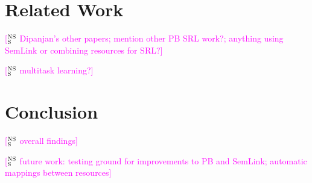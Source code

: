 \documentclass[11pt,a4paper]{article}
\newcommand{\ensuretext}[1]{#1}
\newcommand{\nssmarker}{\ensuretext{\textcolor{magenta}{\ensuremath{^{\textsc{NS}}_{\textsc{S}}}}}}
\newcommand{\arkcomment}[3]{\ensuretext{\textcolor{#3}{[#1 #2]}}}
\newcommand{\nss}[1]{\arkcomment{\nssmarker}{#1}{magenta}}
\newcommand{\finalversion}[1]{}
\begin{document}
\section{Related Work}

\nss{Dipanjan's other papers; mention other PB SRL work?; anything using SemLink or combining resources for SRL?}

\nss{multitask learning?}

\section{Conclusion}

\nss{overall findings}

\nss{future work: testing ground for improvements to PB and SemLink; automatic mappings between resources}

\finalversion{\section*{Acknowledgments}

FUNDING}

\smaller


\setlength{\bibsep}{1pt}
{\fontsize{10}{12.25}\selectfont
}
\end{document}
